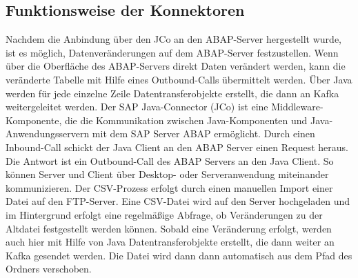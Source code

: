 \subsection*{Funktionsweise der Konnektoren}
Nachdem die Anbindung über den JCo an den ABAP-Server hergestellt wurde, ist es möglich, Datenveränderungen auf dem ABAP-Server festzustellen. Wenn über die Oberfläche des ABAP-Servers direkt Daten verändert werden, kann die veränderte Tabelle mit Hilfe eines Outbound-Calls übermittelt werden.
\newline
Über Java werden für jede einzelne Zeile Datentransferobjekte erstellt, die dann an Kafka weitergeleitet werden.
\newline
\newline
Der SAP Java-Connector (JCo) ist eine Middleware-Komponente, die die Kommunikation zwischen Java-Komponenten und Java-Anwendungsservern mit dem SAP Server ABAP ermöglicht.
\newline
Durch einen Inbound-Call schickt der Java Client an den ABAP Server einen Request heraus. Die Antwort ist ein Outbound-Call des ABAP Servers an den Java Client.
\newline
So können Server und Client über Desktop- oder Serveranwendung miteinander kommunizieren.
\newline
\newline
Der CSV-Prozess erfolgt durch einen manuellen Import einer Datei auf den FTP-Server. Eine CSV-Datei wird auf den Server hochgeladen und im Hintergrund erfolgt eine regelmäßige Abfrage, ob Veränderungen zu der Altdatei festgestellt werden können. Sobald eine Veränderung erfolgt, werden auch hier mit Hilfe von Java Datentransferobjekte erstellt, die dann weiter an Kafka gesendet werden.
Die Datei wird dann dann automatisch aus dem Pfad des Ordners verschoben.

